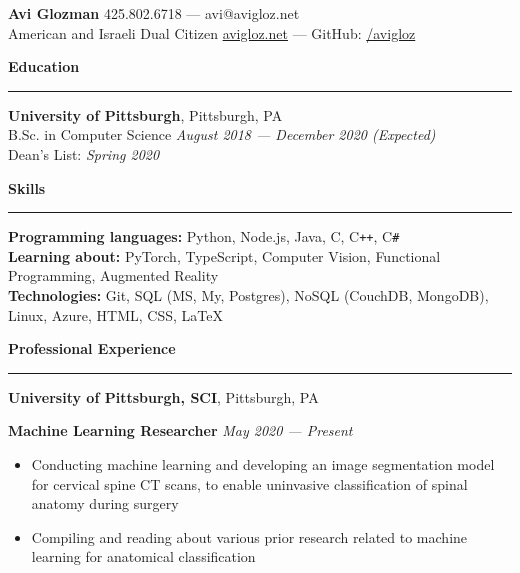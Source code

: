 \documentclass[11pt]{article}
\begin{document}
	\pagestyle{empty}
	\begin{center}
		{\huge \textbf{Avi Glozman}} {\large \hfill 425.802.6718 --- avi@avigloz.net}\\
		\vspace{1.25mm}
		{\large American and Israeli Dual Citizen \hfill \href{https://avigloz.net}{avigloz.net} --- GitHub: \href{https://github.com/avigloz}{/avigloz}}
	\end{center}
	
	\begin{flushleft}
		
		\vspace{-1.65mm}
		{\large \raggedright \textbf{Education}}
		\vspace{1.25mm}
	
		\hrule
		
		\vspace{2.25mm}
		\textbf{University of Pittsburgh}, Pittsburgh, PA\\
		{\small B.Sc. in Computer Science \hfill \textit{August 2018 --- December 2020 (Expected)}}\\
		{\small Dean's List: \textit{Spring 2020}}
	
		\vspace{1.5mm}
		{\large \raggedright \textbf{Skills}}
		\vspace{1.25mm}
	
		\hrule
	
		\vspace{2.25mm}
		\textbf{Programming languages:} Python, Node.js, Java, C, C\texttt{++}, C\verb!#!\\
		\vspace{0.5mm}
		\textbf{Learning about:} PyTorch, TypeScript, Computer Vision, Functional Programming, Augmented Reality\\
		\vspace{0.5mm}
		\textbf{Technologies:} Git, SQL (MS, My, Postgres), NoSQL (CouchDB, MongoDB), Linux, Azure, HTML, CSS, \LaTeX\\

		\vspace{1.5mm}
		{\large \raggedright \textbf{Professional Experience}}
		\vspace{1.25mm}
	
		\hrule

		\vspace{2.25mm}
		\textbf{University of Pittsburgh, SCI}, Pittsburgh, PA\\
		\begin{rightbracket}
			{\small \textbf{Machine Learning Researcher}} \hfill \textit{\small May 2020 --- Present}
			\begin{itemize}
				\item Conducting machine learning and developing an image segmentation model for cervical spine CT scans, to enable uninvasive classification of spinal anatomy during surgery
				\vspace{-2mm}
				\item Compiling and reading about various prior research related to machine learning for anatomical classification
			\end{itemize}
		\end{rightbracket}


\end{flushleft}
\end{document}
